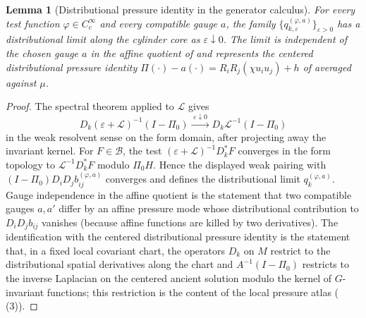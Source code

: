 \documentclass[11pt]{amsart}
\numberwithin{equation}{section}
\theoremstyle{plain}
\newtheorem{lemma}[lemma]{Lemma}
\theoremstyle{definition}
\theoremstyle{remark}
\begin{document}
\begin{lemma}[Distributional pressure identity in the generator calculus]
\label{lem:generator-pressure-identity}
For every test function \(\varphi\in C_c^\infty\) and every compatible
gauge \(a\), the family
\(\{q_{k,\varepsilon}^{(\varphi,a)}\}_{\varepsilon>0}\) has a distributional
limit along the cylinder core as \(\varepsilon\downarrow0\).  The limit is
independent of the chosen gauge \(a\) in the affine quotient of
 and represents the centered
distributional pressure identity
\(\Pi(\cdot)-a(\cdot)=R_iR_j(\chi u_i u_j)+h\) of
 averaged against \(\mu\).
\end{lemma}

\begin{proof}
The spectral theorem applied to \(\mathcal L\) gives
\[
   D_k(\varepsilon+\mathcal L)^{-1}(I-\Pi_0)
   \xrightarrow{\;\varepsilon\downarrow0\;}
   D_k\mathcal L^{-1}(I-\Pi_0)
\]
in the weak resolvent sense on the form domain, after projecting away the
invariant kernel.  For \(F\in\mathcal B\), the test
\((\varepsilon+\mathcal L)^{-1}D_k^*F\) converges in the form topology to
\(\mathcal L^{-1}D_k^*F\) modulo \(\Pi_0H\).  Hence the displayed weak pairing
with \((I-\Pi_0)D_iD_jb_{ij}^{(\varphi,a)}\) converges and defines the
distributional limit \(q_k^{(\varphi,a)}\).  Gauge independence in the affine
quotient is the statement that two compatible
gauges \(a,a'\) differ by an affine pressure mode whose distributional
contribution to \(D_iD_j b_{ij}\) vanishes (because affine functions are
killed by two derivatives).  The identification with the centered
distributional pressure identity is the statement that, in a fixed local
covariant chart, the operators \(D_k\) on \(M\) restrict to the
distributional spatial derivatives along the chart and \(A^{-1}(I-\Pi_0)\)
restricts to the inverse Laplacian on the centered ancient solution
modulo the kernel of \(G\)-invariant functions; this restriction is the
content of the local pressure atlas
(\,(3)).
\end{proof}
\end{document}
